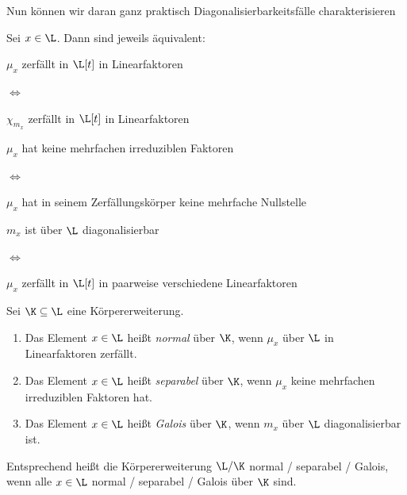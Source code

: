 \documentclass[11pt, a4paper]{article}
\begin{document}
Nun können wir daran ganz praktisch Diagonalisierbarkeitsfälle charakterisieren

\begin{corollary} 
    Sei $x \in \L$. Dann sind jeweils äquivalent:\\
    
    \begin{center}
    \begin{minipage}[c]{0.42\textwidth}\raggedleft
        $\mu_x$ zerfällt in $\L[t]$ in Linearfaktoren
    \end{minipage}
    \hfill $\iff$ \hfill
    \begin{minipage}[c]{0.42\textwidth}\raggedright
        $\chi_{m_x}$ zerfällt in $\L[t]$ in Linearfaktoren
    \end{minipage}

    \vspace{0.4cm}

    \begin{minipage}[c]{0.42\textwidth}\raggedleft
        $\mu_x$ hat keine mehrfachen irreduziblen Faktoren
    \end{minipage}
    \hfill $\iff$ \hfill
    \begin{minipage}[c]{0.42\textwidth}\raggedright
        $\mu_x$ hat in seinem Zerfällungskörper keine mehrfache Nullstelle
    \end{minipage}

    \vspace{0.4cm}

    \begin{minipage}[c]{0.42\textwidth}\raggedleft
        $m_x$ ist über $\L$ diagonalisierbar
    \end{minipage}
    \hfill $\iff$ \hfill
    \begin{minipage}[c]{0.42\textwidth}\raggedright
        $\mu_x$ zerfällt in $\L[t]$ in paarweise verschiedene Linearfaktoren
    \end{minipage}
    \end{center}
\end{corollary}


\begin{definition} \Theorem
    Sei $\K \subseteq \L$ eine Körpererweiterung.
    \begin{enumerate}[label=(\roman*)]
        \item Das Element $x \in \L$ heißt \emph{normal} über $\K$, wenn $\mu_x$ über $\L$ in Linearfaktoren zerfällt.
        \item Das Element $x \in \L$ heißt \emph{separabel} über $\K$, wenn $\mu_x$ keine mehrfachen irreduziblen Faktoren hat.
        \item Das Element $x \in \L$ heißt \emph{Galois} über $\K$, wenn $m_x$ über $\L$ diagonalisierbar ist.
    \end{enumerate}
 Entsprechend heißt die Körpererweiterung  $\L/\K$ normal / separabel / Galois, wenn alle $x\in \L$ normal / separabel / Galois über $\K$ sind.
\end{definition}
\end{document}
